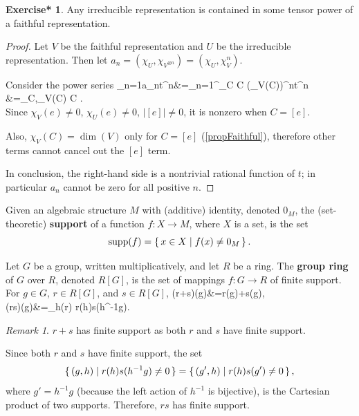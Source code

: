 \documentclass[12pt, letterpaper]{article}
\newcommand{\supp}{\operatorname{supp}}
\newcommand{\card}[1]{\left\lvert #1 \right\rvert}
\newcommand{\conj}{\overline}
\newcommand{\ec}[1]{\left[{#1}\right]}
\newenvironment{eqlong}{\equation\aligned}{\endaligned\endequation}
\theoremstyle{definition}
\theoremstyle{remark}
\newtheorem*{rem*}{Remark}
\theoremstyle{definition}
\newtheorem{exe*}[exe]{Exercise*}
\theoremstyle{plain}
\numberwithin{equation}{section}
\begin{document}
	\begin{exe*}
		Any irreducible representation is contained in 
		some tensor power of a faithful representation.
	\end{exe*}
	\begin{proof}
		Let $V$ be the faithful representation and $U$ be the irreducible representation.
		Then let $a_n = (\chi_U,\chi_{V^{\otimes n}})=(\chi_U,\chi_{V}^n)$.
		
		Consider the power series
		\begin{eqlong}
			\sum_{n=1}a_nt^n&=\frac{1}{\card{G}}\sum_{n=1}^{\infty}\sum_C \card{C}\conj{\chi_U(C)}(\chi_V(C))^nt^n\\
			&=\frac{1}{\card{G}}\sum_{C,\chi_V(C)} \card{C}\conj{\chi_U(C)}\left[\frac{1}{1-\chi_V(C)t}-1\right].\\
		\end{eqlong}
		 Since $\chi_V(e)\ne 0$, $\chi_U(e) \ne 0$, $\card{\ec{e}}\ne 0$,
		 it is nonzero when $C=\ec{e}$.
		 
		 Also, $\chi_V(C) = \dim(V)$ only for $C = \ec{e}$ (\ref{propFaithful}),
		 therefore other terms cannot cancel out the $\ec{e}$ term.
		 
		 In conclusion, the right-hand side is a nontrivial rational function of $t$;
		 in particular $a_n$ cannot be zero for all positive $n$.
	\end{proof}
	\begin{def*}[support]
		Given an algebraic structure $M$ with (additive) identity, denoted $0_M$,
		the (set-theoretic) \textbf{support} of a function $f\colon X\to M$, where $X$ is a set,
		is the set
		\[\supp(f)=\set{x\in X| f(x)\ne 0_M}.\]
	\end{def*}
	\begin{def*}
		Let $G$ be a group, written multiplicatively, and let $R$ be a ring. The \textbf{group ring} of $G$ over $R$,
		denoted $R[G]$, is the set of mappings $f \colon G \to R$ of finite support.
		For $g\in G$, $r\in R[G]$, and $s\in R[G]$,
		\begin{eqlong}
			(r+s)(g)&=r(g)+s(g),\\
			(rs)(g)&=\sum_{h\in \supp(r)} r(h)s(h^{-1}g).
		\end{eqlong}
	\end{def*}
	\begin{rem*}
		$r+s$ has finite support as both $r$ and $s$ have finite support.

		Since both $r$ and $s$ have finite support, the set
		\[ \set{(g,h)|r(h)s(h^{-1}g)\ne  0} = \set{(g',h)|r(h)s(g')\ne0}, \]
		where $g'=h^{-1}g$ (because the left action of $h^{-1}$ is bijective),
		is the Cartesian product of two supports.
		Therefore, $rs$ has finite support.
	\end{rem*}
\end{document}
